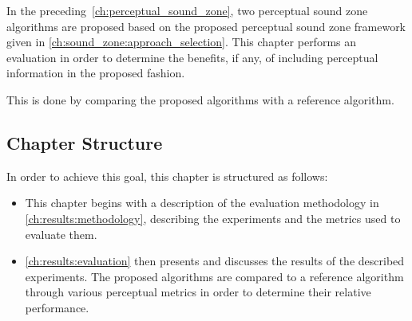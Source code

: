 In the preceding~\autoref{ch:perceptual_sound_zone}, two perceptual sound zone algorithms are proposed based 
on the proposed perceptual sound zone framework given in \autoref{ch:sound_zone:approach_selection}.
This chapter performs an evaluation in order to determine the benefits, if any, of including perceptual 
information in the proposed fashion.

This is done by comparing the proposed algorithms with a reference algorithm.

\subsection*{Chapter Structure}
In order to achieve this goal, this chapter is structured as follows:

\begin{itemize}
    \item This chapter begins with a description of the evaluation methodology in 
        \autoref{ch:results:methodology}, describing the experiments 
        and the metrics used to evaluate them.
    \item \autoref{ch:results:evaluation} then presents and discusses the results of the described experiments. 
        The proposed algorithms are compared to a reference algorithm through various 
        perceptual metrics in order to determine their relative performance.
\end{itemize}
